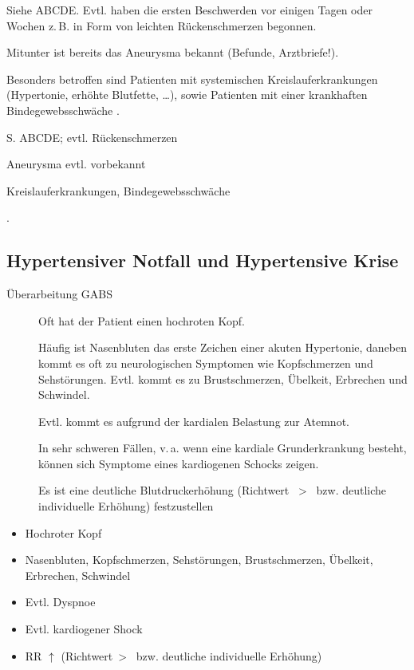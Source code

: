 \documentclass[
ngerman,
paper=a4,
asymmetric,
fontsize=10pt,
draft=false,
numbers=noenddot,
bibtotocnumbered,
footnotes=multiple,
]{scrreprt}
\newcommand{\jALT}{\vspace{6pt}\noindent{\color{red}\sffamily\textbf{DELETED}\hrulefill\newline}}
\newcommand{\jNEUende}{\newline{\color{green}\rule{\linewidth}{3pt}\newline}}
\begin{document}
\TextSlide
{{\TxSAMPLER}}
{
\begin{SAMPLERText}
  \item[\SAMPLER{S}] Siehe ABCDE. Evtl. haben die ersten
  Beschwerden vor einigen Tagen oder Wochen z.\,B. in Form
  von leichten Rückenschmerzen begonnen. 
  \item[\SAMPLER{P}] Mitunter ist bereits das Aneurysma
  bekannt (Befunde, Arztbriefe!).
  \item[\SAMPLER{R}] Besonders betroffen sind Patienten mit
  systemischen Kreislauferkrankungen (Hypertonie, erhöhte
  Blutfette, \ldots), sowie Patienten mit einer krankhaften
  Bindegewebsschwäche .
\end{SAMPLERText}
}
{
\begin{SAMPLERSlide}
  \item[\SAMPLER{S}] S. ABCDE; evtl. Rückenschmerzen
  \item[\SAMPLER{P}] Aneurysma evtl. vorbekannt 
  \item[\SAMPLER{R}] Kreislauferkrankungen,
  Bindegewebsschwäche
\end{SAMPLERSlide}
}
{}
{}
{}
.
\jNEUende

\subsection{Hypertensiver Notfall und Hypertensive Krise}
Überarbeitung GABS

\jALT
\TextSlide
{\TxABCDE}{
\begin{description}
  \item[] Oft hat der Patient einen hochroten Kopf. 
  \item[] Häufig ist Nasenbluten das
  erste Zeichen einer akuten Hypertonie, daneben kommt es
  oft zu neurologischen Symptomen wie Kopfschmerzen und
  Sehstörungen. Evtl. kommt es zu Brustschmerzen, Übelkeit,
   Erbrechen und Schwindel.
   \item[] Evtl. kommt es aufgrund der kardialen Belastung zur Atemnot.
   \item[] In sehr schweren Fällen, v.\,a. wenn eine
   kardiale Grunderkrankung besteht, können sich Symptome
   eines kardiogenen Schocks zeigen.
   \item[] Es ist eine deutliche Blutdruckerhöhung
   (Richtwert ~{\textgreater}~
   bzw. deutliche individuelle Erhöhung) festzustellen
\end{description}
 }
 {
\begin{itemize}
   \item[\ABCDE{EE}] Hochroter Kopf 
   \item[\ABCDE{HB}] Nasenbluten, Kopfschmerzen, Sehstörungen, Brustschmerzen, Übelkeit, Erbrechen, Schwindel
   \item[\ABCDE{B}] Evtl. Dyspnoe
   \item[\ABCDE{C}] Evtl. kardiogener Shock
   \item[\ABCDE{D}] RR $\uparrow$ (Richtwert~{\textgreater}~ 
   bzw. deutliche individuelle Erhöhung)
\end{itemize}
 }
 {}
 {}
 {}
 
\end{document}

